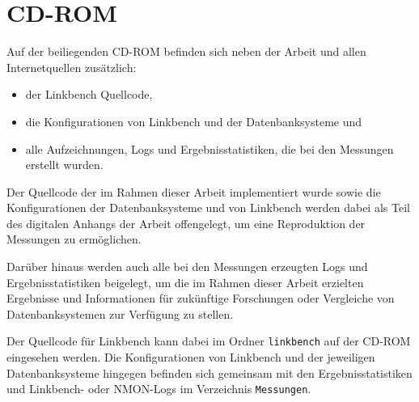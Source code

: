 \chapter{CD-ROM}

Auf der beiliegenden CD-ROM befinden sich neben der Arbeit und allen Internetquellen zusätzlich:
\begin{itemize}
    \item der Linkbench Quellcode,
    \item die Konfigurationen von Linkbench und der Datenbanksysteme und
    \item alle Aufzeichnungen, Logs und Ergebnisstatistiken, die bei den Messungen erstellt wurden. 
\end{itemize}

Der Quellcode der im Rahmen dieser Arbeit implementiert wurde sowie die Konfigurationen der Datenbanksysteme und von Linkbench werden dabei als Teil des digitalen Anhangs der Arbeit offengelegt, um eine Reproduktion der Messungen zu ermöglichen. 

Darüber hinaus werden auch alle bei den Messungen erzeugten Logs und Ergebnisstatistiken beigelegt, um die im Rahmen dieser Arbeit erzielten Ergebnisse und Informationen für zukünftige Forschungen oder Vergleiche von Datenbanksystemen zur Verfügung zu stellen. 

Der Quellcode für Linkbench kann dabei im Ordner \texttt{linkbench} auf der CD-ROM eingesehen werden. Die Konfigurationen von Linkbench und der jeweiligen Datenbanksysteme hingegen befinden sich gemeinsam mit den Ergebnisstatistiken und Linkbench- oder NMON-Logs im Verzeichnis \texttt{Messungen}.